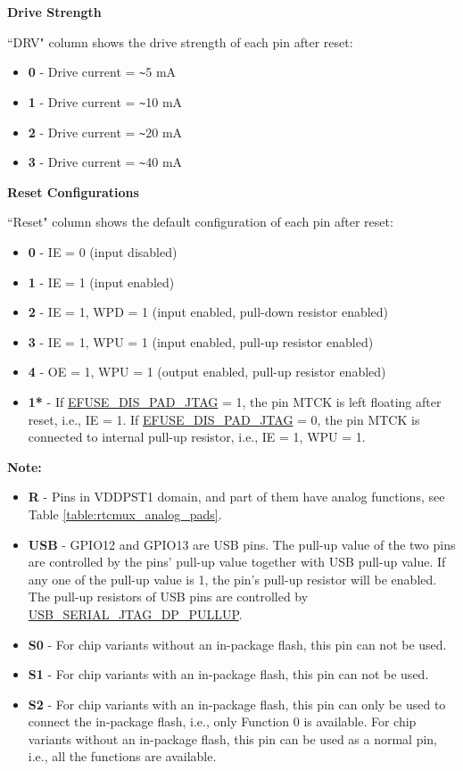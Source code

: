 \textbf{Drive Strength}

``DRV" column shows the drive strength of each pin after reset:

\begin{itemize}
\item \textbf{0} - Drive current = \verb+~+5 mA
\item \textbf{1} - Drive current = \verb+~+10 mA
\item \textbf{2} - Drive current = \verb+~+20 mA
\item \textbf{3} - Drive current = \verb+~+40 mA
\end{itemize}

\textbf{Reset Configurations}

``Reset" column shows the default configuration of each pin after reset:

\begin{itemize}
\item \textbf{0} - IE = 0 (input disabled)
\item \textbf{1} - IE = 1 (input enabled)
\item \textbf{2} - IE = 1, WPD = 1 (input enabled, pull-down resistor enabled)
\item \textbf{3} - IE = 1, WPU = 1 (input enabled, pull-up resistor enabled)
\item \textbf{4} - OE = 1, WPU = 1 (output enabled, pull-up resistor enabled)
\item \textbf{1*} - If \hyperref[fielddesc:EFUSEDISPADJTAG]{EFUSE\_DIS\_PAD\_JTAG} = 1, the pin MTCK is left floating after reset, i.e., IE = 1. If \hyperref[fielddesc:EFUSEDISPADJTAG]{EFUSE\_DIS\_PAD\_JTAG} = 0, the pin MTCK is connected to internal pull-up resistor, i.e., IE = 1, WPU = 1.  
\end{itemize}

\textbf{Note:}

\begin{itemize}
\item \textbf{R} - Pins in VDDPST1 domain, and part of them have analog functions, see Table \ref{table:rtcmux_analog_pads}.
\item \textbf{USB} - GPIO12 and GPIO13 are USB pins. The pull-up value of the two pins are controlled by the pins' pull-up value together with USB pull-up value. If any one of the pull-up value is 1, the pin's pull-up resistor will be enabled. The pull-up resistors of USB pins are controlled by \hyperref[fielddesc:USBSERIALJTAGDPPULLUP]{USB\_SERIAL\_JTAG\_DP\_PULLUP}. 
\item \textbf{S0} - For chip variants without an in-package flash, this pin can not be used.
\item \textbf{S1} - For chip variants with an in-package flash, this pin can not be used.
\item \textbf{S2} - For chip variants with an in-package flash, this pin can only be used to connect the in-package flash, i.e., only Function 0 is available. For chip variants without an in-package flash, this pin can be used as a normal pin, i.e., all the functions are available.
\end{itemize}

